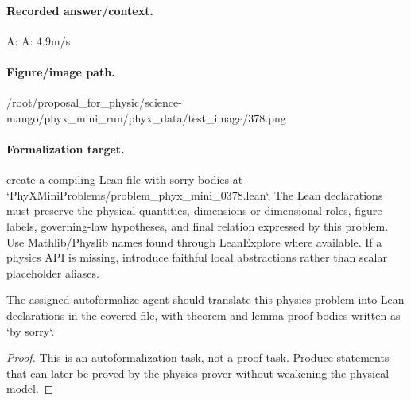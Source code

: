\paragraph{Recorded answer/context.}
A: A: 4.9m/s

\paragraph{Figure/image path.}
/root/proposal\_for\_physic/science-mango/phyx\_mini\_run/phyx\_data/test\_image/378.png

\paragraph{Formalization target.}
create a compiling Lean file with sorry bodies at `PhyXMiniProblems/problem\_phyx\_mini\_0378.lean`. The Lean declarations must preserve the physical quantities, dimensions or dimensional roles, figure labels, governing-law hypotheses, and final relation expressed by this problem.
Use Mathlib/Physlib names found through LeanExplore where available. If a physics API is missing, introduce faithful local abstractions rather than scalar placeholder aliases.

\begin{theorem}
\label{thm:physics:phyx_mini_0378:target}
The assigned autoformalize agent should translate this physics problem into Lean declarations in the covered file, with theorem and lemma proof bodies written as `by sorry`.
\end{theorem}
\begin{proof}
This is an autoformalization task, not a proof task. Produce statements that can later be proved by the physics prover without weakening the physical model.
\end{proof}


